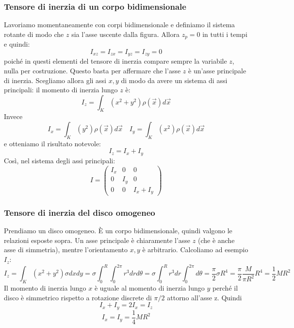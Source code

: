\documentclass[a4paper,openany]{article}
\begin{document}
	\subsubsection{Tensore di inerzia di un corpo bidimensionale}
	Lavoriamo momentaneamente con corpi bidimensionale e definiamo il sistema rotante di modo che $z$ sia l'asse uscente dalla figura. Allora $z_{p} = 0$ in tutti i tempi e quindi:
	$$
	I_{xz} = I_{zx} = I_{yz} = I_{zy} = 0
	$$  
	poiché in questi elementi del tensore di inerzia compare sempre la variabile $z$, nulla per costruzione. Questo basta per affermare che l'asse $z$ è un'asse principale di inerzia. Scegliamo allora gli assi $x,y$ di modo da avere un sistema di assi principali: il momento di inerzia lungo $z$ è:
	$$
	I_{z} = \int_{K}(x^2+y^2)\rho(\vec{x}) d\vec{x}
	$$
	Invece 
	$$
	I_{x} = \int_{K}(y^2)\rho(\vec{x}) d\vec{x} \quad I_{y} = \int_{K}(x^2)\rho(\vec{x}) d\vec{x}
	$$
	e otteniamo il risultato notevole:
	\begin{equation}\label{key}
		I_z = I_x + I_y
	\end{equation}
	Così, nel sistema degli assi principali:
	\begin{equation}\label{key}
		I = 
		\begin{pmatrix}
			I_x & 0 & 0 \\
			0 & I_y & 0 \\
			0 & 0 & I_x + I_y
		\end{pmatrix}
	\end{equation}
	\subsubsection{Tensore di inerzia del disco omogeneo}
	Prendiamo un disco omogeneo. È un corpo bidimensionale, quindi valgono le relazioni esposte sopra. Un asse principale è chiaramente l'asse $z$ (che è anche asse di simmetria), mentre l'orientamento $x,y$ è arbitrario. Calcoliamo ad esempio $I_z$:
	\begin{equation*}\label{key}
		I_{z} = \int_{K}(x^2+y^{2})\sigma dxdy =\sigma \int_{0}^{R}\int_{0}^{2\pi}r^{3}drd\theta = \sigma\int_{0}^{R}r^3 dr \int_{0}^{2\pi} d\theta = \dfrac{\pi}{2}\sigma R^{4} = \dfrac{\pi}{2}\dfrac{M}{\pi R^{2}}R^{4} = \dfrac{1}{2}MR^{2}
	\end{equation*}
	Il momento di inerzia lungo $x$ è uguale al momento di inerzia lungo $y$ perché il disco è simmetrico rispetto a rotazione discrete di $\pi/2$ attorno all'asse z. Quindi
	$$
	I_x + I_y = 2I_x = I_z
	$$
	$$
	I_x = I_y = \dfrac{1}{4}MR^2
	$$
\end{document}
